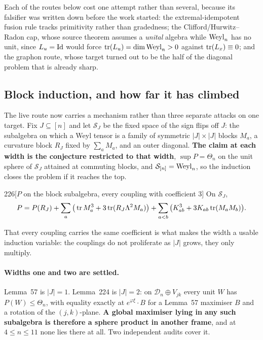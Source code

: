 Each of the routes below cost one attempt rather than several, because its falsifier was written down before the work started: the extremal-idempotent fusion rule tracks primitivity rather than gradedness; the Clifford/Hurwitz--Radon cap, whose source theorem assumes a \emph{unital} algebra while $\mathrm{Weyl}_n$ has no unit, since $L_u=\mathrm{Id}$ would force $\operatorname{tr}(L_u)=\dim\mathrm{Weyl}_n>0$ against $\operatorname{tr}(L_x)\equiv0$; and the graphon route, whose target turned out to be the half of the diagonal problem that is already sharp.

\subsection{Block induction, and how far it has climbed}\label{sec:blockinduction}

The live route now carries a mechanism rather than three separate attacks on one target. Fix $J\subseteq[n]$ and let $\mathcal S_J$ be the fixed space of the sign flips off $J$: the subalgebra on which a Weyl tensor is a family of symmetric $\lvert J\rvert\times\lvert J\rvert$ blocks $M_a$, a curvature block $R_J$ fixed by $\sum_aM_a$, and an outer diagonal. \textbf{The claim at each width is the conjecture restricted to that width}, $\sup P=\Theta_n$ on the unit sphere of $\mathcal S_J$ attained at commuting blocks, and $\mathcal S_{[n]}=\mathrm{Weyl}_n$, so the induction closes the problem if it reaches the top.

\begin{Lem}{226}[$P$ on the block subalgebra, every coupling with coefficient $3$]
On $\mathcal S_J$,
\[
P=P(R_J)+\sum_a\big(\operatorname{tr} M_a^3+3\operatorname{tr}(R_J\Lambda^2M_a)\big)+\sum_{a<b}\big(K_{ab}^3+3K_{ab}\operatorname{tr}(M_aM_b)\big).
\]
\end{Lem}

\noindent That every coupling carries the same coefficient is what makes the width a usable induction variable: the couplings do not proliferate as $\lvert J\rvert$ grows, they only multiply.

\paragraph{Widths one and two are settled.} Lemma~57 is $\lvert J\rvert=1$. Lemma~224 is $\lvert J\rvert=2$: on $\mathcal D_n\oplus V_{jk}$ every unit $W$ has $P(W)\le\Theta_n$, with equality exactly at $e^{\varphi\xi}\cdot B$ for a Lemma~57 maximiser $B$ and a rotation of the $(j,k)$-plane. \textbf{A global maximiser lying in any such subalgebra is therefore a sphere product in another frame}, and at $4\le n\le11$ none lies there at all. Two independent audits cover it.

